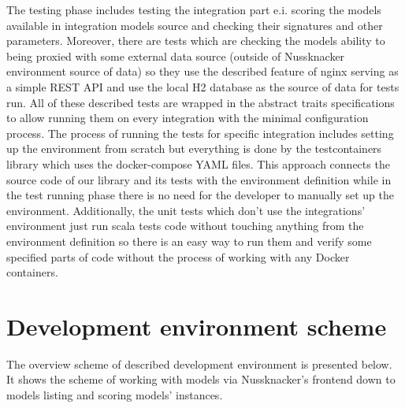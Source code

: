The testing phase includes testing the integration part e.i. scoring the models available in integration
models source and checking their signatures and other parameters. Moreover, there are tests which are
checking the models ability to being proxied with some external data source (outside of Nussknacker
environment source of data) so they use the described feature of nginx serving as a simple REST API
and use the local H2 database as the source of data for tests run. All of these described tests are
wrapped in the abstract traits specifications to allow running them on every integration with the minimal
configuration process. The process of running the tests for specific integration includes setting up the
environment from scratch but everything is done by the testcontainers library which uses the docker-compose
YAML files. This approach connects the source code of our library and its tests with the environment
definition while in the test running phase there is no need for the developer to manually set up the
environment. Additionally, the unit tests which don’t use the integrations’ environment just run scala
tests code without touching anything from the environment definition so there is an easy way to run them
and verify some specified parts of code without the process of working with any Docker containers.

\section{Development environment scheme}

The overview scheme of described development environment is presented below. It shows the scheme of
working with models via Nussknacker's frontend down to models listing and scoring models' instances.

\newpage
\scalebox{0.9}{}

